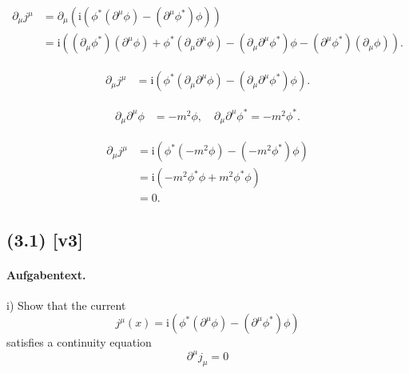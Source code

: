 \documentclass[11pt,a4paper]{article}
\begin{document}
\begin{align*}
\partial_\mu j^\mu &= \partial_\mu \left( \mathrm{i} \left( \phi^* \left( \partial^\mu \phi \right) - \left( \partial^\mu \phi^* \right) \phi \right) \right) \\
&= \mathrm{i} \left( \left( \partial_\mu \phi^* \right) \left( \partial^\mu \phi \right) + \phi^* \left( \partial_\mu \partial^\mu \phi \right) - \left( \partial_\mu \partial^\mu \phi^* \right) \phi - \left( \partial^\mu \phi^* \right) \left( \partial_\mu \phi \right) \right).
\end{align*}


\begin{align*}
\partial_\mu j^\mu &= \mathrm{i} \left( \phi^* \left( \partial_\mu \partial^\mu \phi \right) - \left( \partial_\mu \partial^\mu \phi^* \right) \phi \right).
\end{align*}


\begin{align*}
\partial_\mu \partial^\mu \phi &= -m^2 \phi, \quad \partial_\mu \partial^\mu \phi^* = -m^2 \phi^*.
\end{align*}


\begin{align*}
\partial_\mu j^\mu &= \mathrm{i} \left( \phi^* (-m^2 \phi) - (-m^2 \phi^*) \phi \right) \\
&= \mathrm{i} \left( -m^2 \phi^* \phi + m^2 \phi^* \phi \right) \\
&= 0.
\end{align*}



\subsection*{(3.1) [v3]}
\paragraph{Aufgabentext.}
i) Show that the current
$$
j^\mu(x)=\mathrm{i}\left(\phi^*\left(\partial^\mu \phi\right)-\left(\partial^\mu \phi^*\right) \phi\right)
$$
satisfies a continuity equation
$$
\partial^\mu j_\mu=0
$$
\end{document}
